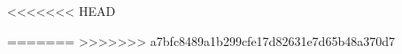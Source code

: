 

\isTRAINERfalse
\isGESOtrue
\isTALSfalse
<<<<<<< HEAD

=======
>>>>>>> a7bfc8489a1b299cfe17d82631e7d65b48a370d7



\renewcommand{\versionMANDANT}{(BECH)}



